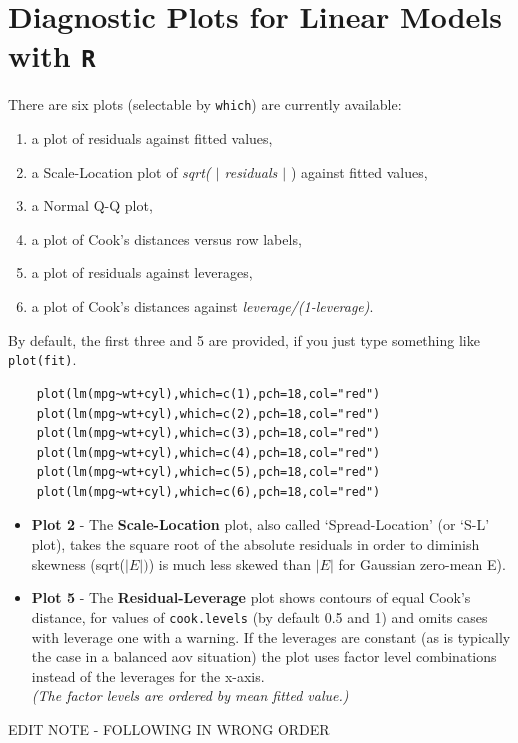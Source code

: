 \documentclass[residuals.tex]{subfiles}
\begin{document}
\Large
\newpage
\section{Diagnostic Plots for Linear Models with \texttt{R}}

There are six plots (selectable by \texttt{which}) are currently available: 
\begin{enumerate}
	\item a plot of residuals against fitted values, 
	\item a Scale-Location plot of \textit{sqrt( $|$ residuals $|$ }) against fitted values, 
	\item a Normal Q-Q plot, 
	\item a plot of Cook's distances versus row labels, 
	\item a plot of residuals against leverages, 
	\item a plot of Cook's distances against \textit{leverage/(1-leverage)}.
\end{enumerate} 

\noindent By default, the first three and 5 are provided, if you just type something like \texttt{plot(fit)}.
\begin{framed}
	\begin{verbatim}
	plot(lm(mpg~wt+cyl),which=c(1),pch=18,col="red")
	plot(lm(mpg~wt+cyl),which=c(2),pch=18,col="red")
	plot(lm(mpg~wt+cyl),which=c(3),pch=18,col="red")
	plot(lm(mpg~wt+cyl),which=c(4),pch=18,col="red")
	plot(lm(mpg~wt+cyl),which=c(5),pch=18,col="red")
	plot(lm(mpg~wt+cyl),which=c(6),pch=18,col="red")
	\end{verbatim}
\end{framed}
\newpage
\begin{itemize}
	\item \textbf{Plot 2} -
	The \textbf{Scale-Location} plot, also called ‘Spread-Location’ (or ‘S-L’ plot), takes the square root of the absolute residuals in order to diminish skewness (sqrt($|E|)$) is much less skewed than $| E |$ for Gaussian zero-mean E).
	
	\item \textbf{Plot 5} - 
	The \textbf{Residual-Leverage} plot shows contours of equal Cook's distance, for values of \texttt{cook.levels} (by default 0.5 and 1) and omits cases with leverage one with a warning. If the leverages are constant (as is typically the case in a balanced aov situation) the plot uses factor level combinations instead of the leverages for the x-axis. \\
	\textit{(The factor levels are ordered by mean fitted value.)}
\end{itemize}
\newpage
EDIT NOTE - FOLLOWING IN WRONG ORDER
\end{document}
